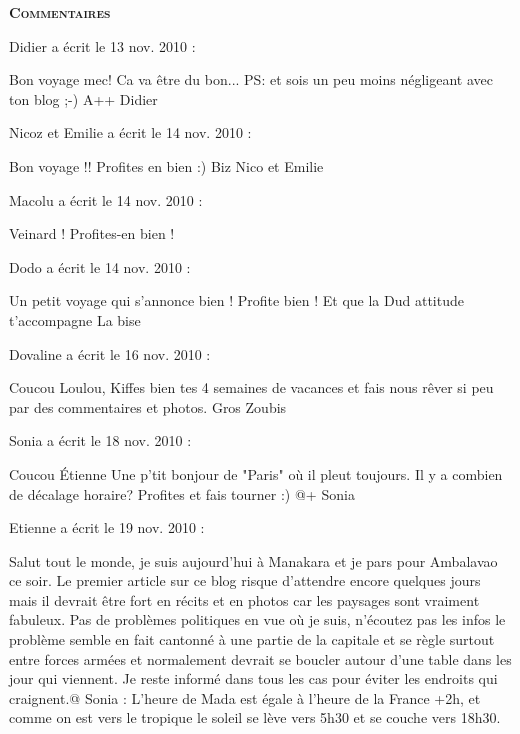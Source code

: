 \bigskip
\textbf{\textsc{Commentaires}}

\medskip
Didier a écrit le 13 nov. 2010 :
\begin{displayquote}
Bon voyage mec! Ca va être du bon...
PS: et sois un peu moins négligeant avec ton blog ;-)
A++
Didier
\end{displayquote}

\medskip
Nicoz et Emilie a écrit le 14 nov. 2010 :
\begin{displayquote}
Bon voyage !!
Profites en bien :)
Biz
Nico et Emilie
\end{displayquote}

\medskip
Macolu a écrit le 14 nov. 2010 :
\begin{displayquote}
Veinard ! Profites-en bien !
\end{displayquote}

\medskip
Dodo a écrit le 14 nov. 2010 :
\begin{displayquote}
Un petit voyage qui s'annonce bien ! Profite bien !
Et que la Dud attitude t'accompagne
La bise
\end{displayquote}

\medskip
Dovaline a écrit le 16 nov. 2010 :
\begin{displayquote}
Coucou Loulou,
Kiffes bien tes 4 semaines de vacances et fais nous rêver si peu par des commentaires et photos.
Gros Zoubis
\end{displayquote}

\medskip
Sonia a écrit le 18 nov. 2010 :
\begin{displayquote}
Coucou Étienne
Une p'tit bonjour de "Paris" où il pleut toujours.
Il y a combien de décalage horaire?
Profites et fais tourner :)
@+
Sonia
\end{displayquote}

\medskip
Etienne a écrit le 19 nov. 2010 :
\begin{displayquote}
Salut tout le monde, je suis aujourd'hui à Manakara et je pars pour Ambalavao ce soir. Le premier article sur ce blog risque d'attendre encore quelques jours mais il devrait être fort en récits et en photos car les paysages sont vraiment fabuleux. Pas de problèmes politiques en vue où je suis, n'écoutez pas les infos le problème semble en fait cantonné à une partie de la capitale et se règle surtout entre forces armées et normalement devrait se boucler autour d'une table dans les jour qui viennent. Je reste informé dans tous les cas pour éviter les endroits qui craignent.@ Sonia : L'heure de Mada est égale à l'heure de la France +2h, et comme on est vers le tropique le soleil se lève vers 5h30 et se couche vers 18h30.
\end{displayquote}

